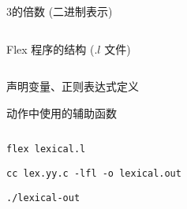 \begin{frame}{}
  \begin{columns}
      \pause
      \begin{center}
        3的倍数 (二进制表示)
      \end{center}
  \end{columns}
\end{frame}

\begin{frame}{}
  \begin{center}
    Flex 程序的结构 ($.l$ 文件)
  \end{center}

  \begin{columns}
      \begin{description}
        \setlength{\itemsep}{12pt}
        \item[声明部分:] 声明变量、正则表达式定义
        \item[转换规则:] 
        \item[辅助函数:] 动作中使用的辅助函数
      \end{description}
  \end{columns}
\end{frame}


\begin{frame}{}
\end{frame}

\begin{frame}{}
  \begin{center}
    \texttt{flex lexical.l}

    \vspace{0.80cm}
    \texttt{cc lex.yy.c -lfl -o lexical.out}

    \vspace{0.80cm}
    \texttt{./lexical-out}
  \end{center}
\end{frame}

